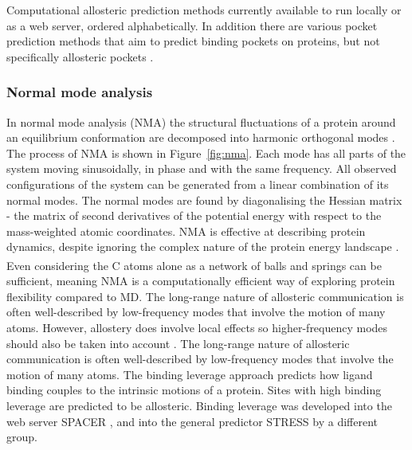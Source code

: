 \begin{table}
\caption[Computational allosteric prediction methods currently available to run locally or as a web server]
{Computational allosteric prediction methods currently available to run locally or as a web server, ordered alphabetically.
In addition there are various pocket prediction methods that aim to predict binding pockets on proteins, but not specifically allosteric pockets \cite{Huang2006, LeGuilloux2009, Cimermancic2016}.}

\label{tab:allosteric_methods}
\end{table}


\subsubsection{Normal mode analysis}

In normal mode analysis (NMA) the structural fluctuations of a protein around an equilibrium conformation are decomposed into harmonic orthogonal modes \cite{Hayward2008}.
The process of NMA is shown in Figure~\ref{fig:nma}.
Each mode has all parts of the system moving sinusoidally, in phase and with the same frequency.
All observed configurations of the system can be generated from a linear combination of its normal modes.
The normal modes are found by diagonalising the Hessian matrix - the matrix of second derivatives of the potential energy with respect to the mass-weighted atomic coordinates.
NMA is effective at describing protein dynamics, despite ignoring the complex nature of the protein energy landscape \cite{Bahar2005}.
Even considering the C\textsuperscript{\textalpha} atoms alone as a network of balls and springs can be sufficient, meaning NMA is a computationally efficient way of exploring protein flexibility compared to MD.
The long-range nature of allosteric communication is often well-described by low-frequency modes that involve the motion of many atoms.
However, allostery does involve local effects so higher-frequency modes should also be taken into account \cite{Collier2013}.
The long-range nature of allosteric communication is often well-described by low-frequency modes that involve the motion of many atoms.
The binding leverage approach \cite{Mitternacht2011} predicts how ligand binding couples to the intrinsic motions of a protein.
Sites with high binding leverage are predicted to be allosteric.
Binding leverage was developed into the web server SPACER \cite{Goncearenco2013}, and into the general predictor STRESS \cite{Clarke2016} by a different group.
